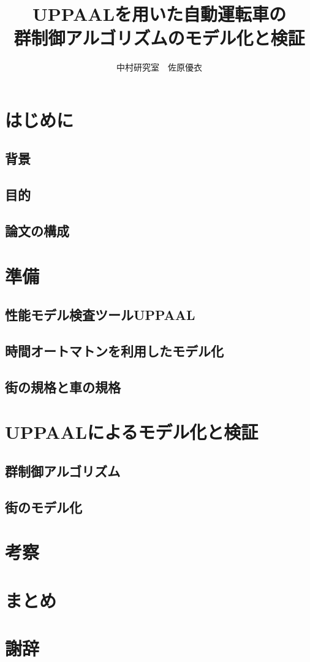\documentclass{jsreport}
\title{UPPAALを用いた自動運転車の\\群制御アルゴリズムのモデル化と検証}
\author{中村研究室　佐原優衣}
\begin{document}
\maketitle
\tableofcontents
\clearpage
\chapter{はじめに}
	\section{背景}
	\section{目的}
	\section{論文の構成}
\chapter{準備}
	\section{性能モデル検査ツールUPPAAL}
	\section{時間オートマトンを利用したモデル化}
	\section{街の規格と車の規格}
\chapter{UPPAALによるモデル化と検証}
	\section{群制御アルゴリズム}
	\section{街のモデル化}
\chapter{考察}
\chapter{まとめ}
\chapter*{謝辞}
\end{document}
